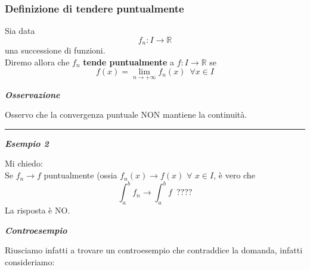 \documentclass{article}
\theoremstyle{definition}
\newcommand{\R}{\mathbb{R}}
\begin{document}
\subsubsection{Definizione di \textbf{tendere puntualmente}}
Sia data 
\begin{equation}
    f_n: I \to \R
\end{equation}
una successione di funzioni.
\\
Diremo allora che $f_n$ \textbf{tende puntualmente} a $f: I \to \R$ se \begin{equation}
    f(x)=\lim_{n \to +\infty}f_n(x) \,\,\, \forall x \in I
\end{equation}
\begin{center}
    \textbf{\textit{Osservazione}}
\end{center}
Osservo che la convergenza puntuale NON mantiene la continuità.
\vspace{15 pt}
\hrule
\vspace{15 pt}
\begin{center}
    \textbf{\textit{Esempio 2}}
\end{center}
Mi chiedo:\\
Se $f_n \to f$ puntualmente (ossia $f_n(x) \to f(x) \,\, \forall \,\, x \in I$, è vero che
\begin{equation}
    \int_a^b f_n \to \int_a^b f \,\,\, ????
\end{equation}
La risposta è NO.
\begin{center}
    \textbf{\textit{Controesempio}}
\end{center}
Riusciamo infatti a trovare un controesempio che contraddice la domanda, infatti consideriamo:
\begin{center}
\end{center}
\end{document}
